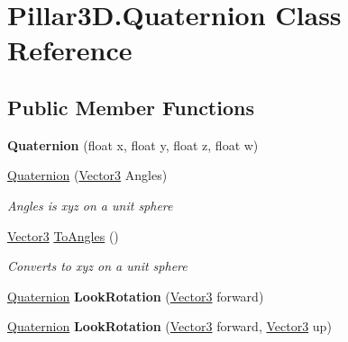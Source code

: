 \hypertarget{class_pillar3_d_1_1_quaternion}{}\section{Pillar3\+D.\+Quaternion Class Reference}
\label{class_pillar3_d_1_1_quaternion}
\subsection*{Public Member Functions}
\begin{DoxyCompactItemize}
\item 
\mbox{\label{class_pillar3_d_1_1_quaternion_ae31516efc345bbc4ccbaf8c00348e5de}} 
{\bfseries Quaternion} (float x, float y, float z, float w)
\item 
\hyperlink{class_pillar3_d_1_1_quaternion_a82aed3ea7cf7302ebb89d33e45941413}{Quaternion} (\hyperlink{class_pillar3_d_1_1_vector3}{Vector3} Angles)
\begin{DoxyCompactList}\small\item\em Angles is xyz on a unit sphere \end{DoxyCompactList}\item 
\hyperlink{class_pillar3_d_1_1_vector3}{Vector3} \hyperlink{class_pillar3_d_1_1_quaternion_aba7fc95eb3ab95f2ca51d4a205c798db}{To\+Angles} ()
\begin{DoxyCompactList}\small\item\em Converts to xyz on a unit sphere \end{DoxyCompactList}\item 
\mbox{\label{class_pillar3_d_1_1_quaternion_aeb011cb05aa967ba639e53234ab74054}} 
\hyperlink{class_pillar3_d_1_1_quaternion}{Quaternion} {\bfseries Look\+Rotation} (\hyperlink{class_pillar3_d_1_1_vector3}{Vector3} forward)
\item 
\mbox{\label{class_pillar3_d_1_1_quaternion_a5184e9984a322ed6acc53da1954d10f2}} 
\hyperlink{class_pillar3_d_1_1_quaternion}{Quaternion} {\bfseries Look\+Rotation} (\hyperlink{class_pillar3_d_1_1_vector3}{Vector3} forward, \hyperlink{class_pillar3_d_1_1_vector3}{Vector3} up)
\end{DoxyCompactItemize}

